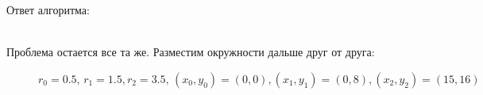 Ответ алгоритма: \\
\begin{figure}[h]
\end{figure}\\
Проблема остается все та же. \newpage Разместим окружности дальше друг от друга: 
\begin{figure}[h!]
\caption{$r_0 = 0.5, \, r_1 = 1.5, r_2 = 3.5, \, (x_0, y_0) = (0, 0), (x_1, y_1) = (0, 8), (x_2, y_2) = (15, 16)$}
\end{figure} \\ 
